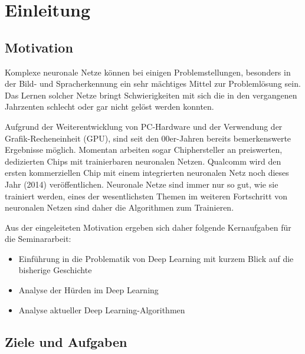 \chapter{Einleitung}
\label{cha:einleitung}

\section{Motivation}

Komplexe neuronale Netze können bei einigen Problemstellungen, besonders in der Bild- und Spracherkennung ein sehr mächtiges Mittel zur Problemlösung sein. Das Lernen solcher Netze bringt Schwierigkeiten mit sich die in den vergangenen Jahrzenten schlecht oder gar nicht gelöst werden konnten.

Aufgrund der Weiterentwicklung von PC-Hardware und der Verwendung der Grafik-Recheneinheit (GPU), sind seit den 00er-Jahren bereits bemerkenswerte Ergebnisse möglich. Momentan arbeiten sogar Chiphersteller an preiswerten, dedizierten Chips mit trainierbaren neuronalen Netzen. Qualcomm wird den ersten kommerziellen Chip mit einem integrierten neuronalen Netz noch dieses Jahr (2014) veröffentlichen. Neuronale Netze sind immer nur so gut, wie sie trainiert werden, eines der wesentlichsten Themen im weiteren Fortschritt von neuronalen Netzen sind daher die Algorithmen zum Trainieren.

Aus der eingeleiteten Motivation ergeben sich daher folgende Kernaufgaben für die Seminararbeit:


\begin{itemize}
\item Einführung in die Problematik von Deep Learning mit kurzem Blick auf die bisherige Geschichte
\item Analyse der Hürden im Deep Learning
\item Analyse aktueller Deep Learning-Algorithmen
\end{itemize}

\section{Ziele und Aufgaben}
 

